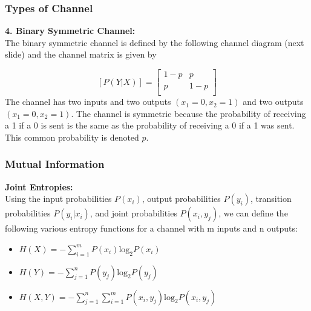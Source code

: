 \documentclass[a4]{beamer}
\begin{document}
\begin{frame}
\frametitle{Types of Channel}
\textbf{4. Binary Symmetric Channel:}\\
The binary symmetric channel is defined by the following channel diagram (next slide) and the channel matrix is given by

\[  [P(Y|X)]  = \left[ \begin{array}{cc}
1-p & p  \\
p & 1-p\\
\end{array} \right] \]
The channel has two inputs and two outputs $(x_1=0,x_2=1)$ and two outputs $(x_1=0,x_2=1)$. The channel is symmetric because the probability of receiving a 1 if a 0 is sent is the same as the probability of receiving a 0 if a 1 was sent. This common probability is denoted $p$.
\end{frame}


\begin{frame}
\frametitle{Mutual Information}
\textbf{Joint Entropies:}\\
Using the input probabilities $P(x_i)$, output probabilities $P(y_i)$, transition probabilities $P(y_i|x_i)$,
and joint probabilities $P(x_i,y_j)$, we can define the following various entropy functions for a channel
with m inputs and n outputs:

\begin{itemize}
\item $H(X) = - \sum ^{m}_{i=1} P(x_i) \mbox{log}_2 P(x_i)$%
\item $H(Y) = - \sum ^{n}_{j=1} P(y_j) \mbox{log}_2 P(y_j)$
\item $H(X, Y)= - \sum ^{n}_{j=1}\sum ^{m}_{i=1} P(x_i,y_j) \mbox{log}_2 P(x_i,y_j)$
\end{itemize}
\end{frame}
\end{document}
